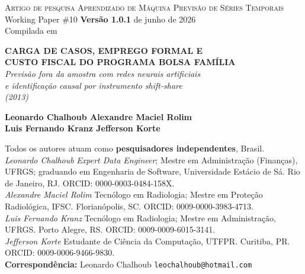 \documentclass[12pt,a4paper,oneside]{article}
\begin{document}
\begin{titlepage}
  \begin{center}
    \vspace*{1.0cm}
    {\small\textsc{Artigo de pesquisa \quad\textbar\quad Aprendizado de Máquina \textendash{} Previsão de Séries Temporais}}\\
    {\small Working Paper \#10 \quad\textbullet\quad \textbf{Versão 1.0.1} \quad\textbullet{} de junho de 2026}\\[2pt]
    {\footnotesize Compilada em \COMPILESTAMP\ \textbullet\ \texttt{\COMPILESHA}}

    \vfill

    {\LARGE\bfseries
     CARGA DE CASOS, EMPREGO FORMAL E\\[6pt]
     CUSTO FISCAL DO PROGRAMA BOLSA FAMÍLIA}\\[14pt]

    {\large
      \textit{Previsão fora da amostra com redes neurais artificiais\\
      e identificação causal por instrumento shift-share\\
      (2013)}}

    \vfill

    {\large\bfseries Leonardo Chalhoub \quad\textbullet\quad Alexandre Maciel Rolim}\\[4pt]
    {\large\bfseries Luis Fernando Kranz \quad\textbullet\quad Jefferson Korte}\\[10pt]
    \begin{minipage}{0.90\textwidth}\centering\footnotesize
      Todos os autores atuam como \textbf{pesquisadores independentes}, Brasil.\\[4pt]
      \textit{Leonardo Chalhoub} \textemdash{} \textit{Expert Data Engineer}; Mestre em
      Administração (Finanças), UFRGS; graduando em Engenharia de Software,
      Universidade Estácio de Sá. Rio de Janeiro, RJ. ORCID: 0000-0003-0484-158X.\\[2pt]
      \textit{Alexandre Maciel Rolim} \textemdash{} Tecnólogo em Radiologia; Mestre em
      Proteção Radiológica, IFSC. Florianópolis, SC. ORCID: 0009-0000-3983-4713.\\[2pt]
      \textit{Luis Fernando Kranz} \textemdash{} Tecnólogo em Radiologia; Mestre em
      Administração, UFRGS. Porto Alegre, RS. ORCID: 0009-0009-6015-3141.\\[2pt]
      \textit{Jefferson Korte} \textemdash{} Estudante de Ciência da Computação, UTFPR.
      Curitiba, PR. ORCID: 0009-0006-9466-9830.\\[4pt]
      \textbf{Correspondência:} Leonardo Chalhoub \textbullet{} \texttt{leochalhoub@hotmail.com}
    \end{minipage}


\end{center}
\end{titlepage}
\end{document}
